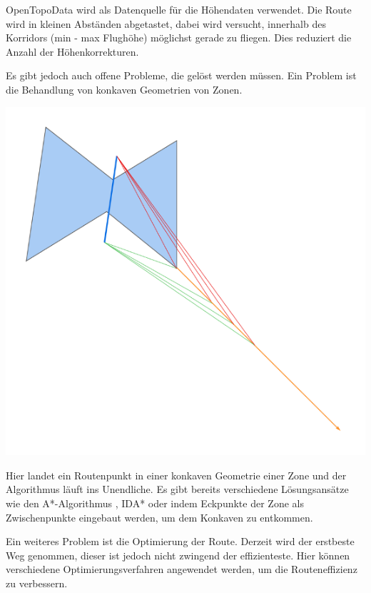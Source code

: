OpenTopoData wird als Datenquelle für die Höhendaten verwendet. Die Route wird in kleinen Abständen abgetastet, dabei wird versucht, innerhalb des Korridors (min - max Flughöhe) möglichst gerade zu fliegen. Dies reduziert die Anzahl der Höhenkorrekturen.

Es gibt jedoch auch offene Probleme, die gelöst werden müssen. Ein Problem ist die Behandlung von konkaven Geometrien von Zonen.

\begin{center}
    \includegraphics[width=\columnwidth]{images/konkaves-problem}
\end{center}

Hier landet ein Routenpunkt in einer konkaven Geometrie einer Zone und der Algorithmus läuft ins Unendliche. Es gibt bereits verschiedene Lösungsansätze wie den A*-Algorithmus \cite{Algorithmus2022}, IDA* \cite{IDA2021} oder indem Eckpunkte der Zone als Zwischenpunkte eingebaut werden, um dem Konkaven zu entkommen.

Ein weiteres Problem ist die Optimierung der Route. Derzeit wird der erstbeste Weg genommen, dieser ist jedoch nicht zwingend der effizienteste. Hier können verschiedene Optimierungsverfahren angewendet werden, um die Routeneffizienz zu verbessern.

